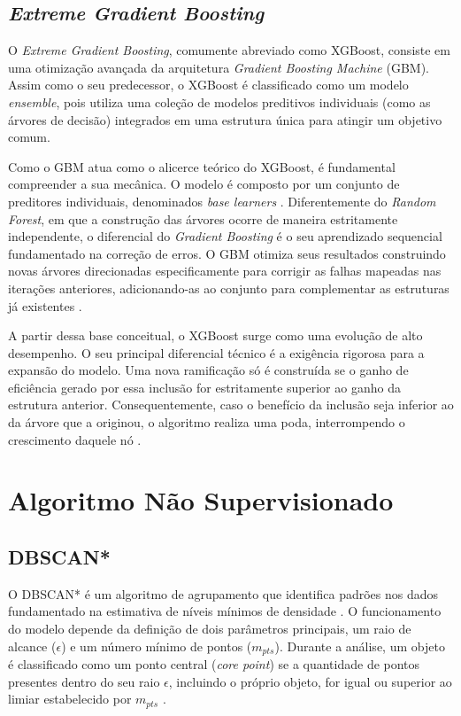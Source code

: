 \documentclass{uflamon}          %
\begin{document}
\subsection{\texorpdfstring{\textit{Extreme Gradient Boosting}}{Extreme Gradient Boosting}}

O \textit{Extreme Gradient Boosting}, comumente abreviado como XGBoost, consiste em uma otimização avançada da arquitetura \textit{Gradient Boosting Machine} (GBM). Assim como o seu predecessor, o XGBoost é classificado como um modelo \textit{ensemble}, pois utiliza uma coleção de modelos preditivos individuais (como as árvores de decisão) integrados em uma estrutura única para atingir um objetivo comum.

Como o GBM atua como o alicerce teórico do XGBoost, é fundamental compreender a sua mecânica. O modelo é composto por um conjunto de preditores individuais, denominados \textit{base learners} \cite{wade2020}. Diferentemente do \textit{Random Forest}, em que a construção das árvores ocorre de maneira estritamente independente, o diferencial do \textit{Gradient Boosting} é o seu aprendizado sequencial fundamentado na correção de erros. O GBM otimiza seus resultados construindo novas árvores direcionadas especificamente para corrigir as falhas mapeadas nas iterações anteriores, adicionando-as ao conjunto para complementar as estruturas já existentes \cite{wade2020, pan2018}.

A partir dessa base conceitual, o XGBoost surge como uma evolução de alto desempenho. O seu principal diferencial técnico é a exigência rigorosa para a expansão do modelo. Uma nova ramificação só é construída se o ganho de eficiência gerado por essa inclusão for estritamente superior ao ganho da estrutura anterior. Consequentemente, caso o benefício da inclusão seja inferior ao da árvore que a originou, o algoritmo realiza uma poda, interrompendo o crescimento daquele nó \cite{chen2016}.

\section{Algoritmo Não Supervisionado}

\subsection{DBSCAN*}
\label{sec:dbscan}

O DBSCAN* é um algoritmo de agrupamento que identifica padrões nos dados fundamentado na estimativa de níveis mínimos de densidade \cite{campello2015, schubert2017}. O funcionamento do modelo depende da definição de dois parâmetros principais, um raio de alcance ($\epsilon$) e um número mínimo de pontos ($m_{pts}$). Durante a análise, um objeto é classificado como um ponto central (\textit{core point}) se a quantidade de pontos presentes dentro do seu raio $\epsilon$, incluindo o próprio objeto, for igual ou superior ao limiar estabelecido por $m_{pts}$ \cite{schubert2017, campello2015}.
\end{document}
